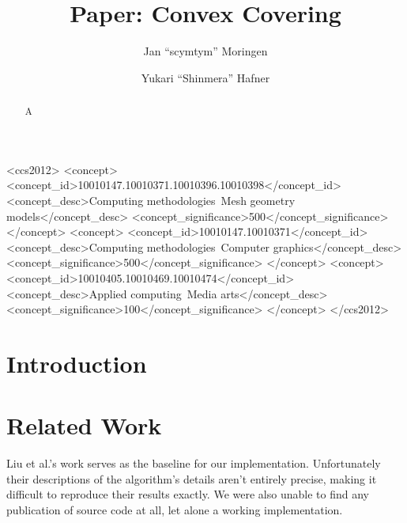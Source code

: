 \documentclass[format=sigconf]{acmart}
\begin{document}
\title{Paper: Convex Covering}

\author{Jan ``scymtym'' Moringen}
\author{Yukari ``Shinmera'' Hafner}

\begin{CCSXML}
  <ccs2012>
  <concept>
  <concept_id>10010147.10010371.10010396.10010398</concept_id>
  <concept_desc>Computing methodologies~Mesh geometry models</concept_desc>
  <concept_significance>500</concept_significance>
  </concept>
  <concept>
  <concept_id>10010147.10010371</concept_id>
  <concept_desc>Computing methodologies~Computer graphics</concept_desc>
  <concept_significance>500</concept_significance>
  </concept>
  <concept>
  <concept_id>10010405.10010469.10010474</concept_id>
  <concept_desc>Applied computing~Media arts</concept_desc>
  <concept_significance>100</concept_significance>
  </concept>
  </ccs2012>
\end{CCSXML}


\begin{abstract}
  A
\end{abstract}


\maketitle

\def\abovecaptionskip{1pt}
\def\listingautorefname{Listing}
\def\figureautorefname{Figure}

\section{Introduction}\label{introduction}

\section{Related Work}\label{relatedwork}
Liu et al.\cite{liu2008convex}'s work serves as the baseline for our implementation. Unfortunately their descriptions of the algorithm's details aren't entirely precise, making it difficult to reproduce their results exactly. We were also unable to find any publication of source code at all, let alone a working implementation.
\end{document}
